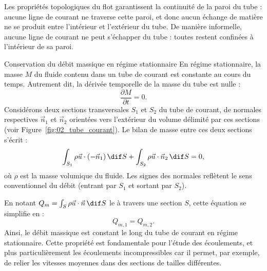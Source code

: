 Les propriétés topologiques du flot garantissent la continuité de la paroi du tube : aucune ligne de courant ne traverse cette paroi, et donc aucun échange de matière ne se produit entre l’intérieur et l’extérieur du tube. De manière informelle, aucune ligne de courant ne peut s’échapper du tube : toutes restent confinées à l’intérieur de sa paroi.

\begin{key}{Conservation du débit massique en régime stationnaire}
En régime stationnaire, la masse $M$ du fluide contenu dans un tube de courant est constante au cours du temps. Autrement dit, la dérivée temporelle de la masse du tube est nulle :
\[
\frac{\partial M}{\partial t} = 0.
\]
Considérons deux sections transversales $S_1$ et $S_2$ du tube de courant, de normales respectives $\vec{n}_1$ et $\vec{n}_2$ orientées vers l’extérieur du volume délimité par ces sections (voir Figure~\ref{fig:02_tube_courant}). Le bilan de masse entre ces deux sections s’écrit :
\[
\int_{{S}_1} \rho \vec{u} \cdot (-\vec{n}_1) \, \dif S + \int_{{S}_2} \rho \vec{u} \cdot \vec{n}_2 \, \dif S = 0,
\]
où $\rho$ est la masse volumique du fluide. Les signes des normales reflètent le sens conventionnel du débit (entrant par ${S}_1$ et sortant par ${S}_2$).

En notant $Q_m = \int_{{S}} \rho \vec{u} \cdot \vec{n} \, \dif S$ le  à travers une section ${S}$, cette équation se simplifie en :
\[
Q_{m,1} = Q_{m,2}.
\]
Ainsi, le débit massique est constant le long du tube de courant en régime stationnaire. Cette propriété est fondamentale pour l’étude des écoulements, et plus particulièrement les écoulements incompressibles car il permet, par exemple, de relier les vitesses moyennes dans des sections de tailles différentes.

  \begin{center}
   \captionsetup{type=figure}
    
  \caption{Le tube de courant est défini comme une surface imaginaire obtenue par l'ensemble continu de lignes de courant générées à partir d'une courbe fermée ${S}_{ab}(0)$. Les sections ${S}_1$ et ${S}_2$ illustrent les surfaces utilisées pour le bilan de masse.}\label{fig:02_tube_courant}
\end{center}


\end{key}

